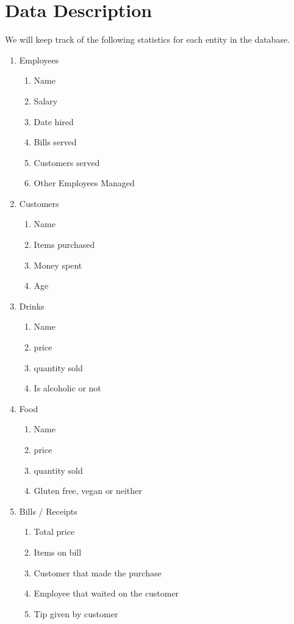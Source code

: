 \documentclass[dvips,12pt]{article}
\begin{document}
\section{Data Description}
We will keep track of the following statistics for each entity in the database.
\begin{enumerate}

\item Employees
\begin{enumerate}
\item Name
\item Salary 
\item Date hired 
\item Bills served 
\item Customers served
 \item Other Employees Managed
\end{enumerate}


\item Customers
\begin{enumerate}
\item Name
 \item Items purchased 
 \item Money spent
\item Age
\end{enumerate}

\item Drinks
\begin{enumerate}
\item Name
 \item price 
\item quantity sold
\item Is alcoholic or not
\end{enumerate}

\item Food
\begin{enumerate}
\item Name
 \item price
 \item quantity sold
\item Gluten free, vegan or neither
\end{enumerate}

\item Bills / Receipts
\begin{enumerate}
\item Total price
\item Items on bill
\item Customer that made the purchase
\item Employee that waited on the customer
\item Tip given by customer
\end{enumerate}

\end{enumerate}
\end{document}
